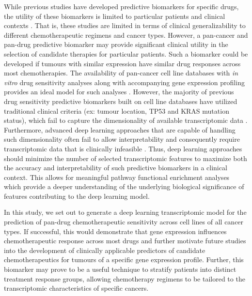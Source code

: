 \documentclass[10pt, letterpaper, twocolumn]{article}
\begin{document}
While previous studies have developed predictive biomarkers for specific drugs, the utility of these biomarkers is limited to particular patients and clinical contexts \cite{drug_sense}. That is, these studies are limited in terms of clinical generalizability to different chemotherapeutic regimens and cancer types. However, a pan-cancer and pan-drug predictive biomarker may provide significant clinical utility in the selection of candidate therapies for particular patients. Such a biomarker could be developed if tumours with similar expression have similar drug responses across most chemotherapies. The availability of pan-cancer cell line databases with \textit{in vitro} drug sensitivity analyses along with accompanying gene expression profiling provides an ideal model for such analyses \cite{gdsc}. However, the majority of previous drug sensitivity predictive biomarkers built on cell line databases have utilized traditional clinical criteria (ex: tumour location, TP53 and KRAS mutation status), which fail to capture the dimensionality of available transcriptomic data \cite{colorectal,gi,lung,breast}. Furthermore, advanced deep learning approaches that are capable of handling such dimensionality often fail to allow interpretability and consequently require transcriptomic data that is clinically infeasible \cite{ml_oncol}. Thus, deep learning approaches should minimize the number of selected transcriptomic features to maximize both the accuracy and interpretability of such predictive biomarkers in a clinical context. This allows for meaningful pathway functional enrichment analyses which provide a deeper understanding of the underlying biological significance of features contributing to the deep learning model.

In this study, we set out to generate a deep learning transcriptomic model for the prediction of pan-drug chemotherapeutic sensitivity across cell lines of all cancer types. If successful, this would demonstrate that gene expression influences chemotherapeutic response across most drugs and further motivate future studies into the development of clinically applicable predictors of candidate chemotherapeutics for tumours of a specific gene expression profile. Further, this biomarker may prove to be a useful technique to stratify patients into distinct treatment response groups, allowing chemotherapy regimens to be tailored to the transcriptomic characteristics of specific cancers.
\end{document}
